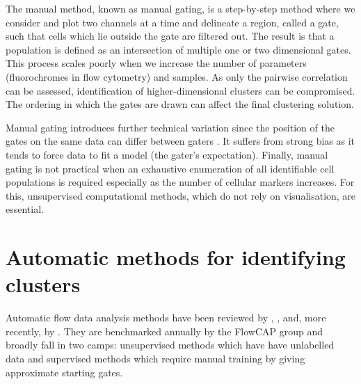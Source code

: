 The manual method, known as manual gating,
is a step-by-step method where we consider and plot two channels at a time and delineate a region, called a gate, such that cells which lie outside the gate are filtered out.
The result is that a population is defined as an intersection of multiple one or two dimensional gates.
This process scales poorly when we increase the number of parameters (fluorochromes in flow cytometry) and samples.
As only the pairwise correlation can be assessed, identification of higher-dimensional clusters can be compromised.
The ordering in which the gates are drawn can affect the final clustering solution.

Manual gating introduces further technical variation since the position of the gates
on the same data can differ between gaters \citep{Maecker:2010fg}.
It suffers from strong bias as it tends to force data to fit a model (the gater's expectation).
Finally, manual gating is not practical when an exhaustive enumeration of all identifiable cell populations is required \citep{Siebert:2010iv,Aghaeepour:2012fq} especially
as the number of cellular markers increases.
For this, unsupervised computational methods, which do not rely on visualisation, are essential.


\section{Automatic methods for identifying clusters}

Automatic flow data analysis methods have been reviewed by \citet{Bashashati:2009em}, \citet{Lugli:2010ki},
and, more recently, by \citet{Aghaeepour:2013dg}.
They are benchmarked annually by the \gls{FlowCAP} 
group and broadly fall in two camps:
unsupervised methods which have have unlabelled data
and
supervised methods which require manual training by giving approximate starting gates.

